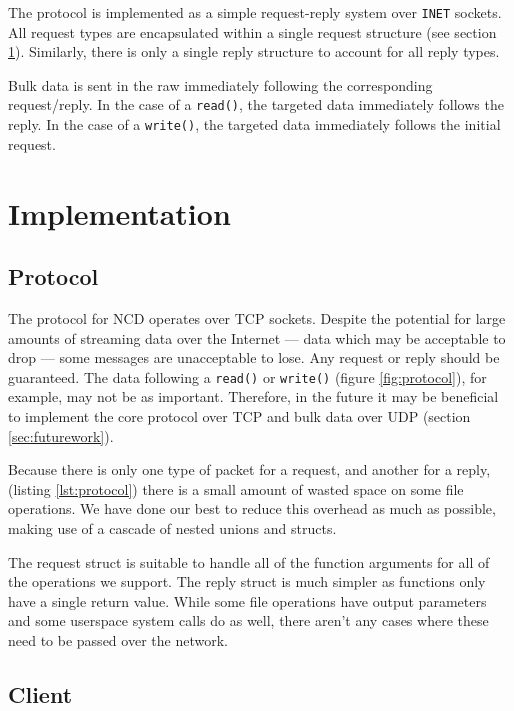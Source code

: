 \documentclass[11pt,twocolumn]{article}
\begin{document}
The protocol is implemented as a simple request-reply system over
\texttt{INET} sockets. All request types are encapsulated within a
single request structure (see section \ref{sec:implementation}).
Similarly, there is only a single reply structure to account for all
reply types.

Bulk data is sent in the raw immediately following the corresponding
request/reply. In the case of a \texttt{read()}, the targeted data
immediately follows the reply. In the case of a \texttt{write()}, the
targeted data immediately follows the initial request.

\section{Implementation}
\label{sec:implementation}

\subsection{Protocol}



The protocol for NCD operates over TCP sockets. Despite the potential
for large amounts of streaming data over the Internet --- data which may
be acceptable to drop --- some messages are unacceptable to lose. Any
request or reply should be guaranteed. The data following a
\texttt{read()} or \texttt{write()} (figure \ref{fig:protocol}), for
example, may not be as important. Therefore, in the future it may be
beneficial to implement the core protocol over TCP and bulk data over
UDP (section \ref{sec:futurework}).

Because there is only one type of packet for a request, and another for
a reply, (listing \ref{lst:protocol}) there is a small amount of wasted
space on some file operations. We have done our best to reduce this
overhead as much as possible, making use of a cascade of nested unions
and structs.

The request struct is suitable to handle all of the function arguments
for all of the operations we support. The reply struct is much simpler
as functions only have a single return value. While some file operations
have output parameters and some userspace system calls do as well, there
aren't any cases where these need to be passed over the network.

\subsection{Client}
\end{document}
